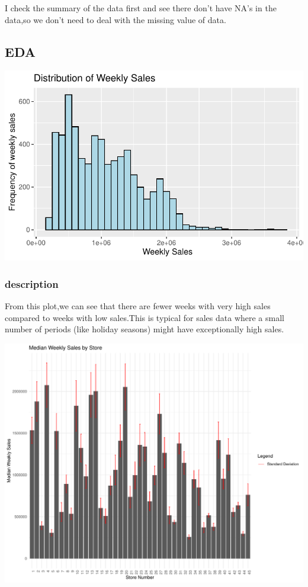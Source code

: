 \documentclass[
  letterpaper,
  DIV=11,
  numbers=noendperiod]{scrartcl}
\begin{document}
I check the summary of the data first and see there don't have NA's in
the data,so we don't need to deal with the missing value of data.

\hypertarget{eda}{%
\subsection{EDA}\label{eda}}

\includegraphics{678final_files/figure-pdf/distribution-plot-1.pdf}

\hypertarget{description}{%
\subsubsection{description}\label{description}}

From this plot,we can see that there are fewer weeks with very high
sales compared to weeks with low sales.This is typical for sales data
where a small number of periods (like holiday seasons) might have
exceptionally high sales.

\includegraphics{678final_files/figure-pdf/bin-plot-1.pdf}
\end{document}
